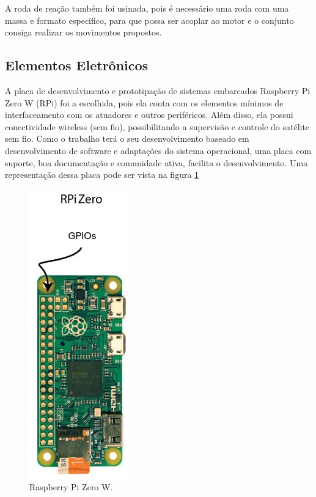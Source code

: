 A roda de reação também foi usinada, pois é necessário uma roda com uma massa e formato específico, para que possa ser acoplar ao motor e o conjunto consiga realizar os movimentos propostos. 



\subsection{Elementos Eletrônicos}

A placa de desenvolvimento e prototipação de sistemas embarcados Raspberry Pi Zero W (RPi) foi a escolhida, pois ela conta com os elementos mínimos de interfaceamento com os atuadores e outros periféricos. Além disso, ela possui conectividade wireless (sem fio), possibilitando a supervisão e controle do satélite sem fio. Como o trabalho terá o seu desenvolvimento baseado em desenvolvimento de software e adaptações do sistema operacional, uma placa com suporte, boa documentação e comunidade ativa, facilita o desenvolvimento. Uma representação dessa placa pode ser vista na figura \ref{fig:rasp_zero}

\begin{figure}[H]
  \caption{Raspberry Pi Zero W.}
  \begin{center}
      \includegraphics[scale=.55]{metodologia/img/rasp_zero}
  \end{center}
  \label{fig:rasp_zero}
\end{figure}

